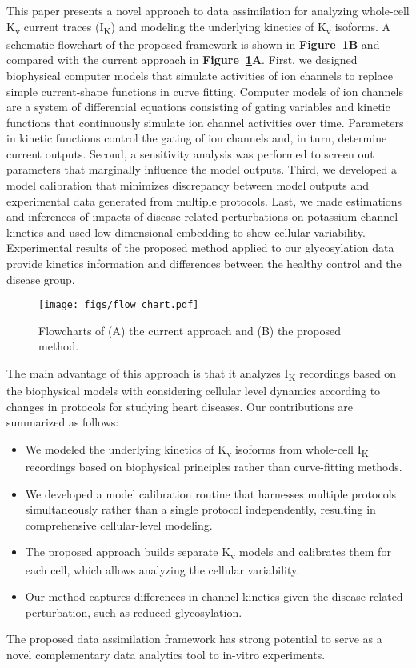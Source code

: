 \documentclass[11pt]{article}
\begin{document}
This paper presents a novel approach to data assimilation for analyzing whole-cell K\textsubscript{v} current traces (I\textsubscript{K}) and modeling the underlying kinetics of K\textsubscript{v} isoforms. A schematic flowchart of the proposed framework is shown in \textbf{Figure~\ref{fig:flow_chart}B} and compared with the current approach in \textbf{Figure~\ref{fig:flow_chart}A}. First, we designed biophysical computer models that simulate activities of ion channels to replace simple current-shape functions in curve fitting. Computer models of ion channels are a system of differential equations consisting of gating variables and kinetic functions that continuously simulate ion channel activities over time. Parameters in kinetic functions control the gating of ion channels and, in turn, determine current outputs. Second, a sensitivity analysis was performed to screen out parameters that marginally influence the model outputs. Third, we developed a model calibration that minimizes discrepancy between model outputs and experimental data generated from multiple protocols. Last, we made estimations and inferences of impacts of disease-related perturbations on potassium channel kinetics and used low-dimensional embedding to show cellular variability. Experimental results of the proposed method applied to our glycosylation data provide kinetics information and differences between the healthy control and the disease group.
\begin{figure}
    \centering
    \texttt{[image: figs/flow\_chart.pdf]}
    \caption{Flowcharts of (A) the current approach and (B) the proposed method.}
    \label{fig:flow_chart}
\end{figure}

The main advantage of this approach is that it analyzes I\textsubscript{K} recordings based on the biophysical models with considering cellular level dynamics according to changes in protocols for studying heart diseases. Our contributions are summarized as follows:
\begin{itemize}
    \item We modeled the underlying kinetics of K\textsubscript{v} isoforms from whole-cell I\textsubscript{K} recordings based on biophysical principles rather than curve-fitting methods.
    \item We developed a model calibration routine that harnesses multiple protocols simultaneously rather than a single protocol independently, resulting in comprehensive cellular-level modeling.
    \item The proposed approach builds separate K\textsubscript{v} models and calibrates them for each cell, which allows analyzing the cellular variability. 
    \item Our method captures differences in channel kinetics given the disease-related perturbation, such as reduced glycosylation.
\end{itemize}
The proposed data assimilation framework has strong potential to serve as a novel complementary data analytics tool to in-vitro experiments. 
\end{document}
